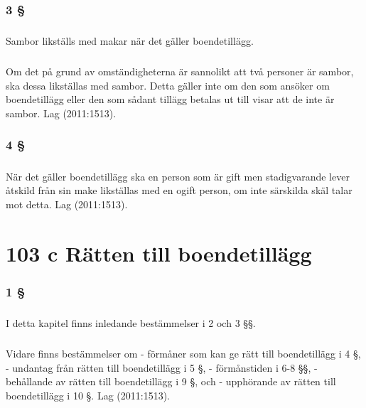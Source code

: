 \documentclass[a4paper,notitlepage,openany,10pt]{book}
\begin{document}
\subsection*{3 §}
\paragraph*{}
Sambor likställs med makar när det gäller boendetillägg.
\paragraph*{}
Om det på grund av omständigheterna är sannolikt att två personer är sambor, ska dessa likställas med sambor. Detta gäller inte om den som ansöker om boendetillägg eller den som sådant tillägg betalas ut till visar att de inte är sambor.
Lag (2011:1513).
\subsection*{4 §}
\paragraph*{}
När det gäller boendetillägg ska en person som är gift men stadigvarande lever åtskild från sin make likställas med en ogift person, om inte särskilda skäl talar mot detta.
Lag (2011:1513).
\chapter*{103 c Rätten till boendetillägg}
\subsection*{1 §}
\paragraph*{}
I detta kapitel finns inledande bestämmelser i 2 och 3 §§.
\paragraph*{}
Vidare finns bestämmelser om
\newline - förmåner som kan ge rätt till boendetillägg i 4 §,
\newline - undantag från rätten till boendetillägg i 5 §,
\newline - förmånstiden i 6-8 §§,
\newline - behållande av rätten till boendetillägg i 9 §, och
\newline - upphörande av rätten till boendetillägg i 10 §.
Lag (2011:1513).
\end{document}
